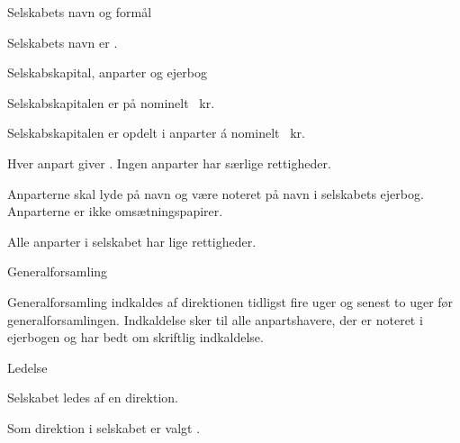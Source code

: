 \begin{enum}

    \item Selskabets navn og formål
    \begin{enum}
        \item Selskabets navn er \@selskabsnavn.

        \item \@formaal
    \end{enum}


    \item Selskabskapital, anparter og ejerbog
    \begin{enum}
        \item Selskabskapitalen er på nominelt \@selskabskapital\ kr.
        
        \item Selskabskapitalen er opdelt i anparter á nominelt \@anpartnominelt\ kr.
        
        \item Hver anpart giver \@anpartstemmer. Ingen anparter har særlige rettigheder.
        
        \item Anparterne skal lyde på navn og være noteret på navn i selskabets ejerbog. Anparterne er ikke omsætningspapirer.
        
        \item Alle anparter i selskabet har lige rettigheder.
    \end{enum}


    \item Generalforsamling
    \begin{enum}
        \item Generalforsamling indkaldes af direktionen tidligst fire uger og senest to uger før generalforsamlingen. Indkaldelse sker til alle anpartshavere, der er noteret i ejerbogen og har bedt om skriftlig indkaldelse.        
    \end{enum}


    \item Ledelse
    \begin{enum}
        \item Selskabet ledes af en direktion.
        \item Som direktion i selskabet er valgt \@direktion.
    \end{enum}



\end{enum}
